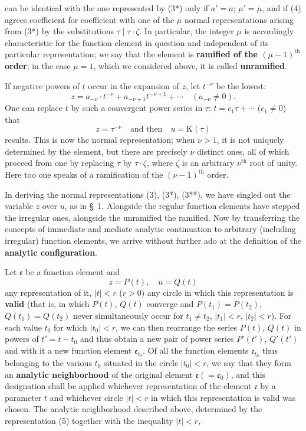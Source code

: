 \documentclass{article}
\begin{document}
can be identical with the one represented by (3*) only if $a' = a$; $\mu' = \mu$, and if (4) agrees coefficient for coefficient with one of the $\mu$ normal representations arising from (3*) by the substitutions $\tau \mid \tau \cdot \zeta$. In particular, the integer $\mu$ is accordingly characteristic for the function element in question and independent of its particular representation; we say that the element is \textbf{ramified of the $(\mu - 1)^{\text{th}}$ order}; in the case $\mu = 1$, which we considered above, it is called \textbf{unramified}.

If negative powers of $t$ occur in the expansion of $z$, let $t^{-\nu}$ be the lowest:
\[ z = a_{-\nu} \cdot t^{-\nu} + a_{-\nu+1} t^{-\nu+1} + \cdots \quad (a_{-\nu} \neq 0). \]
One can replace $t$ by such a convergent power series in $\tau$: $t = c_1 \tau + \cdots$ ($c_1 \neq 0$) that
\[ z = \tau^{-\nu} \quad \text{and then} \quad u = \mathrm{K}(\tau) \tag{3**} \]
results. This is now the normal representation; when $\nu > 1$, it is not uniquely determined by the element, but there are precisely $\nu$ distinct ones, all of which proceed from one by replacing $\tau$ by $\tau \cdot \zeta$, where $\zeta$ is an arbitrary $\nu^{\text{th}}$ root of unity. Here too one speaks of a ramification of the $(\nu - 1)^{\text{th}}$ order.

In deriving the normal representations (3), (3*), (3**), we have singled out the variable $z$ over $u$, as in §~1. Alongside the regular function elements have stepped the irregular ones, alongside the unramified the ramified. Now by transferring the concepts of immediate and mediate analytic continuation to arbitrary (including irregular) function elements, we arrive without further ado at the definition of the \textbf{analytic configuration}.

Let $\mathfrak{e}$ be a function element and
\[ z = P(t), \quad u = Q(t) \tag{5} \]
any representation of it, $|t| < r$ ($r > 0$) any circle in which this representation is \textbf{valid} (that is, in which $P(t)$, $Q(t)$ converge and $P(t_1) = P(t_2)$, $Q(t_1) = Q(t_2)$ never simultaneously occur for $t_1 \neq t_2$, $|t_1| < r$, $|t_2| < r$). For each value $t_0$ for which $|t_0| < r$, we can then rearrange the series $P(t)$, $Q(t)$ in powers of $t' = t - t_0$ and thus obtain a new pair of power series $P'(t')$, $Q'(t')$ and with it a new function element $\mathfrak{e}_{t_0}$. Of all the function elements $\mathfrak{e}_{t_0}$ thus belonging to the various $t_0$ situated in the circle $|t_0| < r$, we say that they form an \textbf{analytic neighborhood} of the original element $\mathfrak{e} (= \mathfrak{e}_0)$, and this designation shall be applied whichever representation of the element $\mathfrak{e}$ by a parameter $t$ and whichever circle $|t| < r$ in which this representation is valid was chosen. The analytic neighborhood described above, determined by the representation (5) together with the inequality $|t| < r$,
\end{document}
